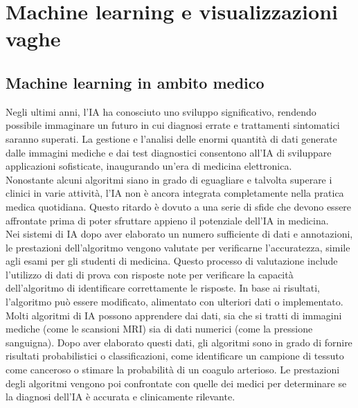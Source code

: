 \chapter{Machine learning e visualizzazioni vaghe}
\label{cap:visualizzazioni-vaghe}

\section{Machine learning in ambito medico }

Negli ultimi anni, l'IA ha conosciuto uno sviluppo significativo, rendendo possibile immaginare un futuro in cui diagnosi errate e trattamenti sintomatici saranno superati. La gestione e l'analisi delle enormi quantità di dati generate dalle immagini mediche e dai test diagnostici consentono all'IA di sviluppare applicazioni sofisticate, inaugurando un'era di medicina elettronica.\\
Nonostante alcuni algoritmi siano in grado di eguagliare e talvolta superare i clinici in varie attività, l'IA non è ancora integrata completamente nella pratica medica quotidiana. Questo ritardo è dovuto a una serie di sfide che devono essere affrontate prima di poter sfruttare appieno il potenziale dell'IA in medicina.\\

Nei sistemi di IA dopo aver elaborato un numero sufficiente di dati e annotazioni, le prestazioni dell'algoritmo vengono valutate per verificarne l'accuratezza, simile agli esami per gli studenti di medicina. Questo processo di valutazione include l'utilizzo di dati di prova con risposte note per verificare la capacità dell'algoritmo di identificare correttamente le risposte. In base ai risultati, l'algoritmo può essere modificato, alimentato con ulteriori dati o implementato.\\

Molti algoritmi di IA possono apprendere dai dati, sia che si tratti di immagini mediche (come le scansioni MRI) sia di dati numerici (come la pressione sanguigna). Dopo aver elaborato questi dati, gli algoritmi sono in grado di fornire risultati probabilistici o classificazioni, come identificare un campione di tessuto come canceroso o stimare la probabilità di un coagulo arterioso. Le prestazioni degli algoritmi vengono poi confrontate con quelle dei medici per determinare se la diagnosi dell'IA è accurata e clinicamente rilevante.\\

